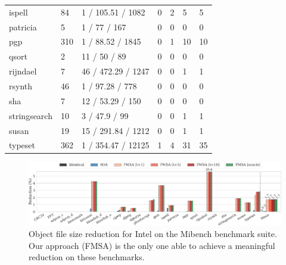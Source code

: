 \begin{table}[h]
{\begin{tabular}{lllllll}
\rowcolor{evencolor} ispell        & 84    & 1 / 105.51 / 1082    & \small 0     & \small 2   & \small 5    & \small 5   \\
                     patricia      & 5     & 1 / 77 / 167         & \small 0     & \small 0   & \small 0    & \small 0   \\
\rowcolor{evencolor} pgp           & 310   & 1 / 88.52 / 1845     & \small 0     & \small 1   & \small 10   & \small 10  \\
                     qsort         & 2     & 11 / 50 / 89         & \small 0     & \small 0   & \small 0    & \small 0   \\
\rowcolor{evencolor} rijndael      & 7     & 46 / 472.29 / 1247   & \small 0     & \small 0   & \small 1    & \small 1   \\
                     rsynth        & 46    & 1 / 97.28 / 778      & \small 0     & \small 0   & \small 0    & \small 0   \\
\rowcolor{evencolor} sha           & 7     & 12 / 53.29 / 150     & \small 0     & \small 0   & \small 0    & \small 0   \\
                     stringsearch  & 10    & 3 / 47.9 / 99        & \small 0     & \small 0   & \small 1    & \small 1   \\
\rowcolor{evencolor} susan         & 19    & 15 / 291.84 / 1212   & \small 0     & \small 0   & \small 1    & \small 1   \\
                     typeset       & 362   & 1 / 354.47 / 12125   & \small 1     & \small 4   & \small 31   & \small 35  \\
\bottomrule
\end{tabular}
}
\label{tab:stats-mibench}
\end{table}


\begin{figure}[t]
  \centering
  \includegraphics[width=\linewidth]{figs/code-size-reduction-mibench.pdf}
  \caption{Object file size reduction for Intel on the Mibench benchmark suite.
   Our approach (FMSA) is the only one able to achieve a meaningful reduction on these benchmarks.}
  \label{fig:code-size-reduction-mibench}
\end{figure}

